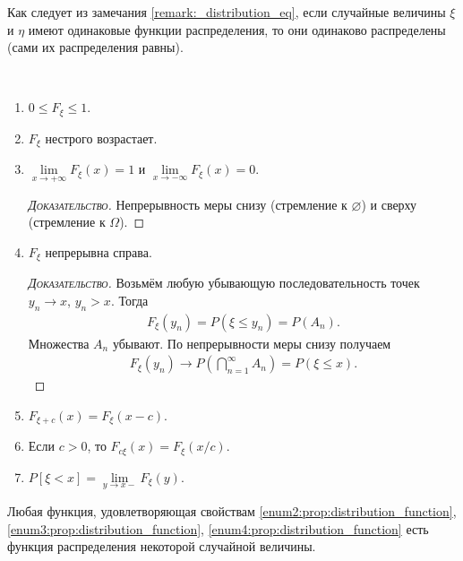 \documentclass[../main.tex]{subfiles}
\begin{document}
\begin{remrk*}
 Как следует из замечания \ref{remark:_distribution_eq}, если случайные величины $ \xi $ и $ \eta $ имеют одинаковые функции распределения, то они одинаково распределены (сами их распределения равны).
\end{remrk*}
\begin{prop*}\
 \begin{enumerate}
  \item $0 \leqslant F_{\xi} \leqslant 1$.
  \item \label{enum2:prop:distribution_function} $F_{\xi}$  нестрого возрастает.
  \item \label{enum3:prop:distribution_function} $\lim\limits_{x \to +\infty} F_{\xi}(x) = 1$  и $\lim\limits_{x \to -\infty} F_{\xi}(x) = 0$.
   \begin{proof}[\normalfont\textsc{Доказательство}]
    Непрерывность меры снизу (стремление к $\varnothing$) и сверху (стремление к $\Omega$).
   \end{proof}
  \item \label{enum4:prop:distribution_function} $F_{\xi}$  непрерывна справа.
   \begin{proof}[\normalfont\textsc{Доказательство}]
    Возьмём любую убывающую последовательность точек $y_n \to x$, $y_n > x$. Тогда
    \begin{align*}
     F_{\xi}(y_n) = P(\xi \leqslant y_n) = P(A_n)
    .\end{align*} Множества $A_n$ убывают. По непрерывности меры снизу получаем
    \begin{align*}
     F_{\xi}(y_n) \to P \left( \bigcap_{n=1}^{\infty} A_n \right) = P(\xi \leqslant x).
    \end{align*} 
   \end{proof}
  \item $F_{\xi + c}(x) = F_{\xi}(x - c)$.
  \item Если $c > 0$, то $F_{c\xi}(x) = F_{\xi}(x / c)$.
  \item $P[\xi < x] = \lim\limits_{y \to x-} F_{\xi}(y)$.
 \end{enumerate}
\end{prop*}
\begin{remrk}
 Любая функция, удовлетворяющая свойствам \ref{enum2:prop:distribution_function}, \ref{enum3:prop:distribution_function}, \ref{enum4:prop:distribution_function} есть функция распределения некоторой случайной величины.
\end{remrk}
\end{document}

